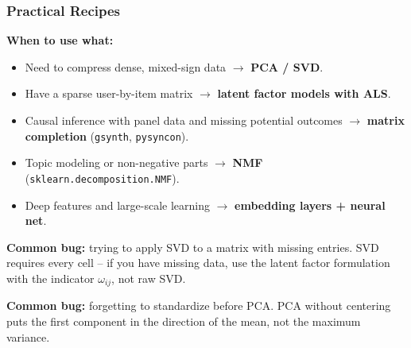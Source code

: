 \documentclass[notes,11pt, aspectratio=169]{beamer}
\begin{document}
\begin{frame}
\frametitle{Practical Recipes}

\textbf{When to use what:}
\begin{itemize}
    \item Need to compress dense, mixed-sign data $\to$ \textbf{PCA / SVD}.
    \item Have a sparse user-by-item matrix $\to$ \textbf{latent factor models with ALS}.
    \item Causal inference with panel data and missing potential outcomes $\to$ \textbf{matrix completion} (\texttt{gsynth}, \texttt{pysyncon}).
    \item Topic modeling or non-negative parts $\to$ \textbf{NMF} (\texttt{sklearn.decomposition.NMF}).
    \item Deep features and large-scale learning $\to$ \textbf{embedding layers + neural net}.
\end{itemize}

\vspace{8pt}
\textbf{Common bug:} trying to apply SVD to a matrix with missing entries. SVD requires every cell -- if you have missing data, use the latent factor formulation with the indicator $\omega_{ij}$, not raw SVD.

\vspace{6pt}
\textbf{Common bug:} forgetting to standardize before PCA. PCA without centering puts the first component in the direction of the mean, not the maximum variance.
\end{frame}
\end{document}
